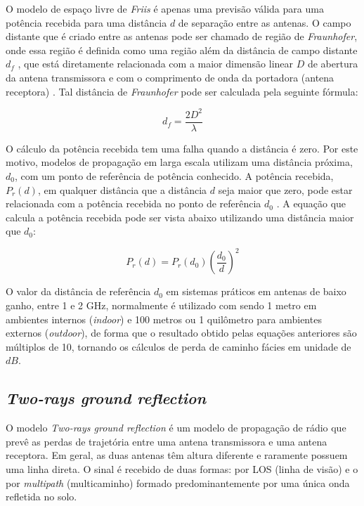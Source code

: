 \documentclass[
	12pt,				%
	twoside,			%
	a4paper,			%
	english,			%
	french,				%
	spanish,			%
	brazil				%
	]{abntex2}
\begin{document}
O modelo de espaço livre de \emph{Friis} é apenas uma previsão válida
para uma potência recebida para uma distância \(d\) de separação entre
as antenas. O campo distante que é criado entre as antenas pode ser
chamado de região de \emph{Fraunhofer}, onde essa região é definida como
uma região além da distância de campo distante \(d_{f}\) , que está
diretamente relacionada com a maior dimensão linear \(D\) de abertura da
antena transmissora e com o comprimento de onda da portadora (antena
receptora) \cite{RAPPAPORT}. Tal distância de \emph{Fraunhofer} pode ser
calculada pela seguinte fórmula:

\begin{equation}
    d_{f} =  \frac{2D^{2}}{\lambda}
\end{equation}

O cálculo da potência recebida tem uma falha quando a distância é zero.
Por este motivo, modelos de propagação em larga escala utilizam uma
distância próxima, \(d_{0}\), com um ponto de referência de potência
conhecido. A potência recebida, \(P_{r}(d)\), em qualquer distância que
a distância \(d\) seja maior que zero, pode estar relacionada com a
potência recebida no ponto de referência \(d_{0}\) \cite{RAPPAPORT}. A
equação que calcula a potência recebida pode ser vista abaixo utilizando
uma distância maior que \(d_{0}\):

\begin{equation}
    P_{r}(d) = P_{r}(d_{0})(\frac{d_{0}}{d})^{2}
\end{equation}

O valor da distância de referência \(d_{0}\) em sistemas práticos em
antenas de baixo ganho, entre 1 e 2 GHz, normalmente é utilizado com
sendo 1 metro em ambientes internos (\emph{indoor}) e 100 metros ou 1
quilômetro para ambientes externos (\emph{outdoor}), de forma que o
resultado obtido pelas equações anteriores são múltiplos de 10, tornando
os cálculos de perda de caminho fácies em unidade de \(dB\).

\subsection{\texorpdfstring{\emph{Two-rays ground
reflection}}{Two-rays ground reflection}}\label{sec:two_rays}

O modelo \emph{Two-rays ground reflection} é um modelo de propagação de
rádio que prevê as perdas de trajetória entre uma antena transmissora e
uma antena receptora. Em geral, as duas antenas têm altura diferente e
raramente possuem uma linha direta\cite{LUO}. O sinal é recebido de duas
formas: por LOS (linha de visão) e o por \emph{multipath} (multicaminho)
formado predominantemente por uma única onda refletida no solo.
\end{document}
